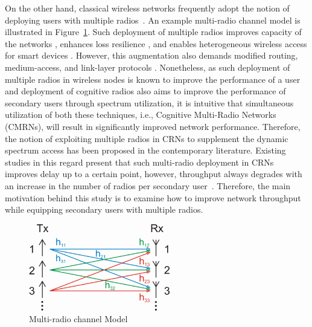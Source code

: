 On the other hand, classical wireless networks frequently adopt the notion of deploying users with multiple radios~\cite{bahl2004reconsidering, adya2004multi}. An example multi-radio channel model is illustrated in Figure~\ref{fig:MIMO}. Such deployment of multiple radios improves capacity of the networks \cite{draves2004routing, bahl2004reconsidering}, enhances loss resilience \cite{miu2005improving}, and enables heterogeneous wireless access for smart devices \cite{song2012performance}. However, this augmentation also demands modified routing, medium-access, and link-layer protocols \cite{kyasanur2006routing, chatterjee2013low}. Nonetheless, as such deployment of multiple radios in wireless nodes is known to improve the performance of a user and  deployment of cognitive radios also aims to improve the performance of secondary users through spectrum utilization, it is intuitive that simultaneous utilization of both these techniques, i.e., Cognitive Multi-Radio Networks (CMRNs), will result in significantly improved network performance. Therefore, the notion of exploiting multiple radios in CRNs to supplement the dynamic spectrum access has been proposed in the contemporary literature. Existing studies in this regard present that such multi-radio deployment in CRNs improves delay up to a certain point, however, throughput always degrades with an increase in the number of radios per secondary user~\cite{khan2015towards}. Therefore, the main motivation behind this study is to examine how to improve network throughput while equipping secondary users with multiple radios.

\begin{figure}[!htbp]
    \begin{center}
        \includegraphics[width=0.55\textwidth]{myFigures/MIMO.png}
        \caption{Multi-radio channel Model~\cite{mimoWiki}}
        \label{fig:MIMO}
    \end{center}
\end{figure}

